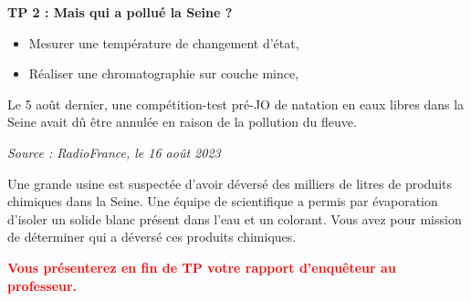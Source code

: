 
\renewcommand{\thesubsection}{\textcolor{red}{\Roman{section}.\arabic{subsection}}}
\renewcommand{\thesubsubsection}{\textcolor{red}{\Roman{section}.\arabic{subsection}.\alph{subsubsection}}}

\setcounter{section}{0}
\setcounter{document}{0}
\sndEnTeteTPDeux

\begin{center}
\begin{mdframed}[style=titr, leftmargin=60pt, rightmargin=60pt, innertopmargin=7pt, innerbottommargin=7pt, innerrightmargin=8pt, innerleftmargin=8pt]

\begin{center}
\large{\textbf{TP 2 : Mais qui a pollué la Seine ?}}
\end{center}

\end{mdframed}
\end{center}



\begin{tcolorbox}[colback=blue!5!white,colframe=blue!75!black,title=Objectifs de la séance :]
\begin{itemize}
    \item Mesurer une température de changement d'état,
    \item Réaliser une chromatographie sur couche mince,
\end{itemize}
\end{tcolorbox}

\begin{tcolorbox}[colback=orange!5!white,colframe=orange!75!black,title= Scénario:]
\og Le 5 août dernier, une compétition-test pré-JO de natation en eaux libres dans la Seine avait dû être annulée en raison de la pollution du fleuve.\fg 
\begin{flushright}
    \textit{Source : RadioFrance, le 16 août 2023}
\end{flushright}
\begin{large}
\end{large} Une grande usine est suspectée d’avoir déversé des milliers de litres de produits chimiques dans la Seine. Une équipe de scientifique a permis par évaporation d'isoler un solide blanc présent dans l'eau et un colorant. Vous avez pour mission de déterminer qui a déversé ces produits chimiques.
\end{tcolorbox}
\begin{center}
    \textbf{\textcolor{red}{Vous présenterez en fin de TP votre rapport d'enquêteur au professeur.}}
\end{center}

